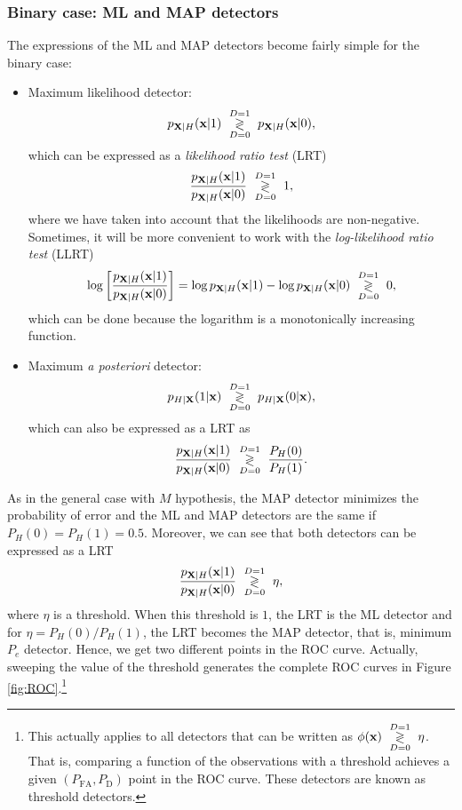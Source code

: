 \subsubsection{Binary case: ML and MAP detectors}

The expressions of the ML and MAP detectors become fairly simple for the binary case:
\begin{itemize}
    \item Maximum likelihood detector:
    $$p_{{\bf X}|H}({\bf x}|1) \,\, \underset{D=0}{\overset{D=1}{\gtrless}}\,\, p_{{\bf X}|H}({\bf x}|0),$$
    which can be expressed as a {\em likelihood ratio test} (LRT)
    $$\displaystyle\frac{p_{{\bf X}|H}({\bf x}|1)}{p_{{\bf X}|H}({\bf x}|0)} \,\, \underset{D=0}{\overset{D=1}{\gtrless}}\,\, 1,$$
    where we have taken into account that the likelihoods are non-negative. Sometimes, it will be more convenient to work with the {\em log-likelihood ratio test} (LLRT)
    \begin{equation}
    \label{eq:LLRT}
    \log \left[ \frac{p_{{\bf X}|H}({\bf x}|1)}{p_{{\bf X}|H}({\bf x}|0)} \right] = \log p_{{\bf X}|H}({\bf x}|1) - \log p_{{\bf X}|H}({\bf x}|0) \,\, \underset{D=0}{\overset{D=1}{\gtrless}}\,\, 0,
    \end{equation}
    which can be done because the logarithm is a monotonically increasing function.
    \item Maximum \emph{a posteriori} detector:
    $$p_{H|{\bf X}}(1|{\bf x}) \,\, \underset{D=0}{\overset{D=1}{\gtrless}}\,\, p_{H|{\bf X}}(0|{\bf x}),$$
    which can also be expressed as a LRT as
    $$\displaystyle\frac{p_{{\bf X}|H}({\bf x}|1)}{p_{{\bf X}|H}({\bf x}|0)} \,\, \underset{D=0}{\overset{D=1}{\gtrless}}\,\, \displaystyle\frac{P_H(0)}{P_H(1)}.$$
\end{itemize}

As in the general case with $M$ hypothesis, the MAP detector minimizes the probability of error and the ML and MAP detectors are the same if $P_H(0)=P_H(1)=0.5$. Moreover, we can see that both detectors can be expressed as a LRT
    $$\displaystyle\frac{p_{{\bf X}|H}({\bf x}|1)}{p_{{\bf X}|H}({\bf x}|0)} \,\, \underset{D=0}{\overset{D=1}{\gtrless}}\,\, \eta,$$
where $\eta$ is a threshold. When this threshold is $1$, the LRT is the ML detector and for $\eta = P_H(0)/P_H(1)$, the LRT becomes the MAP detector, that is, minimum $P_e$ detector. Hence, we get two different points in the ROC curve. Actually, sweeping the value of the threshold generates the complete ROC curves in Figure \ref{fig:ROC}.\footnote{This actually applies to all detectors that can be written as $\phi({\bf x}) \,\, \underset{D=0}{\overset{D=1}{\gtrless}}\,\, \eta$. That is, comparing a function of the observations with a threshold achieves a given $(P_\text{FA},P_\text{D})$ point in the ROC curve. These detectors are known as threshold detectors.}


